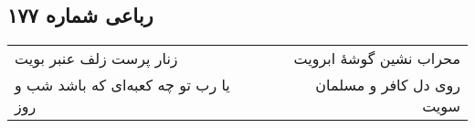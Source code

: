 \begin{center}
\section*{رباعی شماره ۱۷۷}
\label{sec:sh177}
\begin{longtable}{l p{0.5cm} r}
زنار پرست زلف عنبر بویت
&&
محراب نشین گوشهٔ ابرویت
\\
یا رب تو چه کعبه‌ای که باشد شب و روز
&&
روی دل کافر و مسلمان سویت
\\
\end{longtable}
\end{center}
